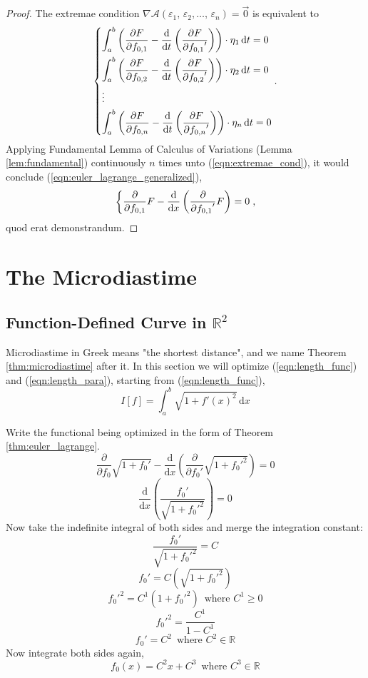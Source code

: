 \documentclass[12pt,a4paper]{article}
\newcommand{\eqnref}[1]{(\ref{#1})}
\begin{document}
\begin{proof}
The extremae condition $\nabla\mathcal{A}(\varepsilon_1,\,\varepsilon_2,\dots,\,\varepsilon_n)=\vec{0}$ is equivalent to
\begin{gather}
\label{eqn:extremae_cond}
\begin{dcases}
\displaystyle\int_a^b\left(\frac{\partial F}{\partial f_{0,1}}-\frac{\mathrm{d}}{\mathrm{d}t}\left(\frac{\partial F}{\partial {f_{0,1}}'}\right)\right)\cdot\eta_1\,\mathrm{d}t=0\\
\displaystyle\int_a^b\left(\frac{\partial F}{\partial f_{0,2}}-\frac{\mathrm{d}}{\mathrm{d}t}\left(\frac{\partial F}{\partial {f_{0,2}}'}\right)\right)\cdot\eta_2\,\mathrm{d}t=0\\
\vdots\\
\displaystyle\int_a^b\left(\frac{\partial F}{\partial f_{0,n}}-\frac{\mathrm{d}}{\mathrm{d}t}\left(\frac{\partial F}{\partial {f_{0,n}}'}\right)\right)\cdot\eta_n\,\mathrm{d}t=0
\end{dcases}.
\end{gather}
Applying Fundamental Lemma of Calculus of Variations (Lemma \ref{lem:fundamental}) continuously $n$ times unto \eqnref{eqn:extremae_cond}, it would conclude \eqnref{eqn:euler_lagrange_generalized},
\[
\begin{dcases}
\frac{\partial}{\partial f_{0,1}}F-\frac{\mathrm{d}}{\mathrm{d}x}\left(\frac{\partial}{\partial {f_{0,1}}'}F\right)=0
\end{dcases},
\]
 quod erat demonstrandum.
\end{proof}

\section{The Microdiastime}
\subsection{Function-Defined Curve in $\mathbb{R}^2$}
Microdiastime in Greek means "the shortest distance", and we name Theorem \ref{thm:microdiastime} after it. In this section we will optimize \eqnref{eqn:length_func} and \eqnref{eqn:length_para}, starting from \eqnref{eqn:length_func},
\[
I[f]=\int_a^b\sqrt{1+f'(x)^2}\,\mathrm{d}x
\]

Write the functional being optimized in the form of Theorem \ref{thm:euler_lagrange}.
\[
\frac{\partial}{\partial f_0}\sqrt{1+{f_0}'}-\frac{\mathrm{d}}{\mathrm{d}x}\left(\frac{\partial}{\partial {f_0}'}\sqrt{1+{f_0}'^2}\right)=0
\]
\[
\frac{\mathrm{d}}{\mathrm{d}x}\left(\frac{{f_0}'}{\sqrt{1+{f_0}'^2}}\right)=0
\]
Now take the indefinite integral of both sides and merge the integration constant:
\[
\frac{{f_0}'}{\sqrt{1+{f_0}'^2}}=C
\]
\[
{f_0}'=C\left(\sqrt{1+{f_0}'^2}\right)
\]
\[
{f_0}'^2=C^1\left(1+{f_0}'^2\right)\,\text{ where }C^1\geq0
\]
\[
{f_0}'^2=\frac{C^1}{1-C^1}
\]
\[
{f_0}'=C^2\,\text{ where }C^2\in\mathbb{R}
\]
Now integrate both sides again,
\[
f_0(x)=C^2x+C^3\,\text{ where }C^3\in\mathbb{R}
\]
\end{document}
